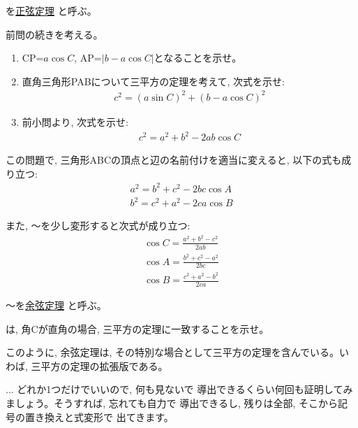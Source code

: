を\underline{正弦定理} と呼ぶ。\mv

\begin{q}\label{q:trig_yogen}
前問の続きを考える。
\begin{enumerate}
\item CP=$a\cos C$, AP=$|b-a\cos C|$となることを示せ。
\item 直角三角形PABについて三平方の定理を考えて, 次式を示せ:
\begin{eqnarray}
c^2=(a\sin C)^2+(b-a\cos C)^2
\end{eqnarray}
\item 前小問より, 次式を示せ:
\begin{eqnarray}
c^2=a^2+b^2-2ab\cos C\label{eq:th_cos1}
\end{eqnarray}
\end{enumerate}\end{q}\mv

この問題で, 三角形ABCの頂点と辺の名前付けを適当に変えると, 以下の式も成り立つ:
\begin{eqnarray}
a^2=b^2+c^2-2bc\cos A\label{eq:th_cos12}\\
b^2=c^2+a^2-2ca\cos B\label{eq:th_cos13}
\end{eqnarray}

また, 〜を少し変形すると次式が成り立つ:
\begin{eqnarray}
\cos C=\frac{a^2+b^2-c^2}{2ab}\label{eq:th_cos2}\\
\cos A=\frac{b^2+c^2-a^2}{2bc}\label{eq:th_cos3}\\
\cos B=\frac{c^2+a^2-b^2}{2ca}\label{eq:th_cos4}
\end{eqnarray}

〜を\underline{余弦定理}
と呼ぶ。

\begin{q}\label{q:trig_yogen_pyutag}
は, 角Cが直角の場合, 三平方の定理に一致することを示せ。\end{q}

このように, 余弦定理は, その特別な場合として三平方の定理を含んでいる。いわば, 
三平方の定理の拡張版である。
\mv

\begin{faq}{\small{} ... どれか1つだけでいいので, 何も見ないで
導出できるくらい何回も証明してみましょう。そうすれば, 忘れても自力で
導出できるし, 残りは全部, そこから記号の置き換えと式変形で
出てきます。}\end{faq}
\mv

